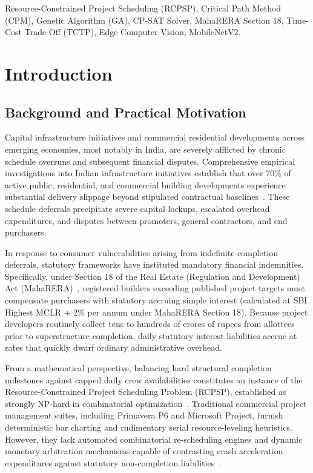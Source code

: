\documentclass[conference]{IEEEtran}
\begin{document}
\begin{IEEEkeywords}
Resource-Constrained Project Scheduling (RCPSP), Critical Path Method (CPM), Genetic Algorithm (GA), CP-SAT Solver, MahaRERA Section 18, Time-Cost Trade-Off (TCTP), Edge Computer Vision, MobileNetV2.
\end{IEEEkeywords}

\section{Introduction}

\subsection{Background and Practical Motivation}
Capital infrastructure initiatives and commercial residential developments across emerging economies, most notably in India, are severely afflicted by chronic schedule overruns and subsequent financial disputes. Comprehensive empirical investigations into Indian infrastructure initiatives establish that over 70\% of active public, residential, and commercial building developments experience substantial delivery slippage beyond stipulated contractual baselines~\cite{doloi2012analysing}. These schedule deferrals precipitate severe capital lockups, escalated overhead expenditures, and disputes between promoters, general contractors, and end purchasers.

In response to consumer vulnerabilities arising from indefinite completion deferrals, statutory frameworks have instituted mandatory financial indemnities. Specifically, under Section 18 of the Real Estate (Regulation and Development) Act (MahaRERA)~\cite{maharera2016act}, registered builders exceeding published project targets must compensate purchasers with statutory accruing simple interest (calculated at SBI Highest MCLR + 2\% per annum under MahaRERA Section 18). Because project developers routinely collect tens to hundreds of crores of rupees from allottees prior to superstructure completion, daily statutory interest liabilities accrue at rates that quickly dwarf ordinary administrative overhead.

From a mathematical perspective, balancing hard structural completion milestones against capped daily crew availabilities constitutes an instance of the Resource-Constrained Project Scheduling Problem (RCPSP), established as strongly NP-hard in combinatorial optimization~\cite{hartmann1998competitive,kolisch1996psplib}. Traditional commercial project management suites, including Primavera P6 and Microsoft Project, furnish deterministic bar charting and rudimentary serial resource-leveling heuristics. However, they lack automated combinatorial re-scheduling engines and dynamic monetary arbitration mechanisms capable of contrasting crash acceleration expenditures against statutory non-completion liabilities~\cite{jain2023penalty}.
\end{document}
